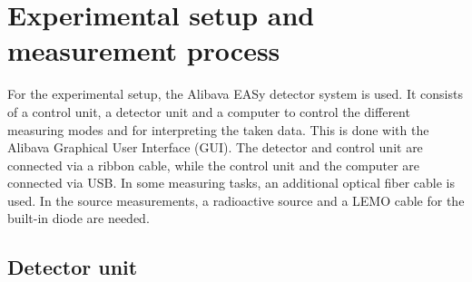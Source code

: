 \section{Experimental setup and measurement process}
\label{sec:Setup}
For the experimental setup, the Alibava EASy detector system is used. It consists of a control unit, a detector unit
and a computer to control the different measuring modes and for interpreting the taken data. This is done with the
Alibava Graphical User Interface (GUI). The detector and control unit are connected via a ribbon cable, while the 
control unit and the computer are connected via USB. In some measuring tasks, an additional optical fiber cable is
used. In the source measurements, a radioactive source and a LEMO cable for the built-in diode are needed.

\subsection{Detector unit}

